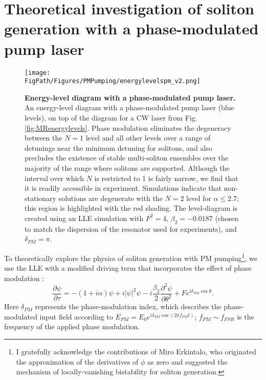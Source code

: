 \section{Theoretical investigation of soliton generation with a phase-modulated pump laser}
\begin{figure}[htpb]
	\begin{center}
		\texttt{[image: \\FigPath/Figures/PMPumping/energylevelspm\_v2.png]}
	\end{center}
	\caption[Energy-level diagram with a phase-modulated pump laser]{\textbf{Energy-level diagram with a phase-modulated pump laser.} An energy-level diagram with a phase-modulated pump laser (blue levels), on top of the diagram for a CW laser from Fig. \ref{fig:MRenergylevels}. Phase modulation eliminates the degeneracy between the $N=1$ level and all other levels over a range of detunings near the minimum detuning for solitons, and also precludes the existence of stable multi-soliton ensembles over the majority of the range where solitons are supported. Although the interval over which $N$ is restricted to 1 is fairly narrow, we find that it is readily accessible in experiment. Simulations indicate that non-stationary solutions are degenerate with the $N=2$ level for $\alpha\leq2.7$; this region is highlighted with the red shading. The level-diagram is created using an LLE simulation with $F^2=4$, $\beta_2=-0.0187$ (chosen to match the dispersion of the resonator used for experiments), and $\delta_{PM}=\pi$.} 
	\label{fig:PMenergylevels}
\end{figure} 

To theoretically explore the physics of soliton generation with PM pumping\footnote{I gratefully acknowledge the contributions of Miro Erkintalo, who originated the approximation of the derivatives of $\phi$ as zero and suggested the mechanism of locally-vanishing bistability for soliton generation.}, we use the LLE with a modified driving term that incorporates the effect of phase modulation \cite{Taheri2015}:
\begin{equation}
\frac{\partial \psi}{\partial \tau}=-(1+i \alpha) \psi + i|\psi|^2 \psi -i \frac{\beta_2}{2} \frac{\partial^2 \psi}{\partial \theta^2} +Fe^{i\delta_{PM}\cos{\theta}}. \label{eq:PMLLE}
\end{equation}
Here $\delta_{PM}$ represents the phase-modulation index, which describes the phase-modulated input field according to $E_{PM}=E_0 e^{i\delta_{PM}\cos(2\pi f_{PM}t)}$; $f_{PM}\sim f_{FSR}$ is the frequency of the applied phase modulation.



